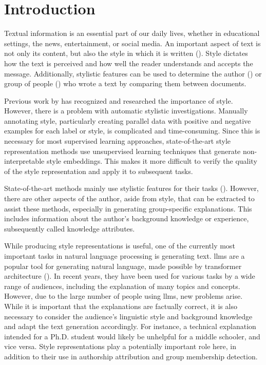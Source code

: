 \chapter{Introduction}
\label{sec:introduction}
Textual information is an essential part of our daily lives, whether in educational settings, the news, entertainment, or social media. An important aspect of text is not only its content, but also the style in which it is written (\cite{wegmannSameAuthorJust2022}). Style dictates how the text is perceived and how well the reader understands and accepts the message. Additionally, stylistic features can be used to determine the author (\cite{alshomaryLatentSpaceInterpretation2024}) or group of people (\cite{10.1007/978-3-642-29047-3_27}) who wrote a text by comparing them between documents.

Previous work by \citet{zhu-etal-2024-styleflow, ijcai2020p526,wegmannSameAuthorJust2022} has recognized and researched the importance of style. However, there is a problem with automatic stylistic investigations. Manually annotating style, particularly creating parallel data with positive and negative examples for each label or style, is complicated and time-consuming. Since this is necessary for most supervised learning approaches, state-of-the-art style representation methods use unsupervised learning techniques that generate non-interpretable style embeddings. This makes it more difficult to verify the quality of the style representation and apply it to subsequent tasks.


State-of-the-art methods mainly use stylistic features for their tasks (\cite{alshomaryLatentSpaceInterpretation2024,patelLearningInterpretableStyle2023,konenStyleVectorsSteering2024,zhu-etal-2024-styleflow}). However, there are other aspects of the author, aside from style, that can be extracted to assist these methods, especially in generating group-specific explanations. This includes information about the author's background knowledge or experience, subsequently called knowledge attributes.

While producing style representations is useful, one of the currently most important tasks in natural language processing is generating text. \Acp{llm} are a popular tool for generating natural language, made possible by transformer architecture (\cite{NIPS2017_3f5ee243}). In recent years, they have been used for various tasks by a wide range of audiences, including the explanation of many topics and concepts. However, due to the large number of people using \acp{llm}, new problems arise. While it is important that the explanations are factually correct, it is also necessary to consider the audience's linguistic style and background knowledge and adapt the text generation accordingly. For instance, a technical explanation intended for a Ph.D. student would likely be unhelpful for a middle schooler, and vice versa. Style representations play a potentially important role here, in addition to their use in authorship attribution and group membership detection.


